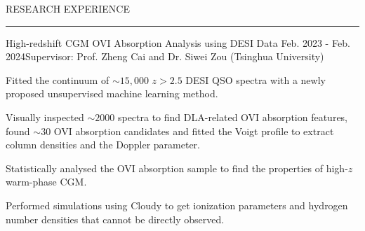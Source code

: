 \documentclass{resume} %
\renewenvironment{rSection}[1]{
\sectionskip
\textcolor{TsinghuaPurple}{\MakeUppercase{#1}}
\sectionlineskip
\hrule
\begin{list}{}{
\setlength{\leftmargin}{0em}
}
\item[]
}{
\end{list}
}
\begin{document}
\begin{rSection}{RESEARCH EXPERIENCE}
\begin{rSubsection}{High-redshift CGM OVI Absorption Analysis using DESI Data} {Feb. 2023 - Feb. 2024}{Supervisor: Prof. Zheng Cai and Dr. Siwei Zou (Tsinghua University)}
    \item Fitted the continuum of $\sim15,000$ $z>2.5$ DESI QSO spectra with a newly proposed unsupervised machine learning method.
    \item Visually inspected $\sim2000$ spectra to find DLA-related OVI absorption features, found $\sim30$ OVI absorption candidates and fitted the Voigt profile to extract column densities and the Doppler parameter.
    \item Statistically analysed the OVI absorption sample to find the properties of high-$z$ warm-phase CGM.
    \item Performed simulations using Cloudy to get ionization parameters and hydrogen number densities that cannot be directly observed.
    \end{rSubsection}





\end{rSection}
\end{document}
